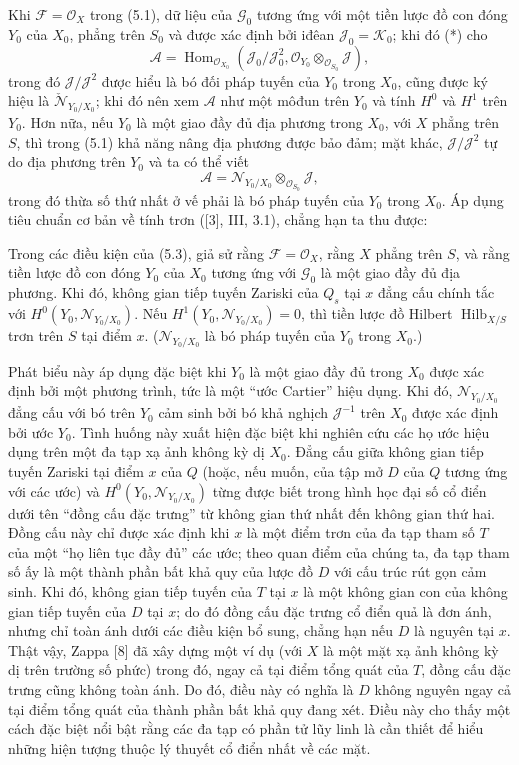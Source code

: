 Khi $\mathcal F=\mathcal O_X$ trong (5.1), dữ liệu của
$\mathcal G_0$ tương ứng với một tiền lược đồ con đóng $Y_0$ của
$X_0$, phẳng trên $S_0$ và được xác định bởi iđêan
$\mathcal J_0=\mathcal K_0$; khi đó (*) cho
\[
\mathcal A=\operatorname{Hom}_{\mathcal O_{X_0}}
(\mathcal J_0/\mathcal J_0^2,
\mathcal O_{Y_0}\otimes_{\mathcal O_{S_0}}\mathcal J),
\]
trong đó $\mathcal J/\mathcal J^2$ được hiểu là bó đối pháp tuyến của $Y_0$
trong $X_0$, cũng được ký hiệu là
$\check{\mathcal N}_{Y_0/X_0}$; khi đó nên xem $\mathcal A$ như một môđun
trên $Y_0$ và tính $H^0$ và $H^1$ trên $Y_0$. Hơn nữa, nếu $Y_0$ là một giao
đầy đủ địa phương trong $X_0$, với $X$ phẳng trên $S$, thì trong (5.1) khả
năng nâng địa phương được bảo đảm; mặt khác,
$\mathcal J/\mathcal J^2$ tự do địa phương trên $Y_0$ và ta có thể viết
\[
\mathcal A=\mathcal N_{Y_0/X_0}\otimes_{\mathcal O_{S_0}}\mathcal J,
\]
trong đó thừa số thứ nhất ở vế phải là bó pháp tuyến của $Y_0$ trong $X_0$.
Áp dụng tiêu chuẩn cơ bản về tính trơn ([3], III, 3.1), chẳng hạn ta thu được:

 Trong các điều kiện của (5.3), giả sử rằng
$\mathcal F=\mathcal O_X$, rằng $X$ phẳng trên $S$, và rằng tiền lược đồ con
đóng $Y_0$ của $X_0$ tương ứng với $\mathcal G_0$ là một giao đầy đủ địa
phương. Khi đó, không gian tiếp tuyến Zariski của $Q_s$ tại $x$ đẳng cấu chính
tắc với $H^0(Y_0,\mathcal N_{Y_0/X_0})$. Nếu
$H^1(Y_0,\mathcal N_{Y_0/X_0})=0$, thì tiền lược đồ Hilbert
$\operatorname{Hilb}_{X/S}$ trơn trên $S$ tại điểm $x$.
($\mathcal N_{Y_0/X_0}$ là bó pháp tuyến của $Y_0$ trong $X_0$.)

 Phát biểu này áp dụng đặc biệt khi $Y_0$ là một giao
đầy đủ trong $X_0$ được xác định bởi một phương trình, tức là một ``ước
Cartier'' hiệu dụng. Khi đó, $\mathcal N_{Y_0/X_0}$ đẳng cấu với bó trên $Y_0$
cảm sinh bởi bó khả nghịch $\mathcal J^{-1}$ trên $X_0$ được xác định bởi
ước $Y_0$. Tình huống này xuất hiện đặc biệt khi nghiên cứu các họ ước hiệu
dụng trên một đa tạp xạ ảnh không kỳ dị $X_0$. Đẳng cấu giữa không gian tiếp
tuyến Zariski tại điểm $x$ của $Q$ (hoặc, nếu muốn, của tập mở $D$ của $Q$
tương ứng với các ước) và $H^0(Y_0,\mathcal N_{Y_0/X_0})$ từng được biết trong
hình học đại số cổ điển dưới tên ``đồng cấu đặc trưng'' từ không gian thứ nhất
đến không gian thứ hai. Đồng cấu này chỉ được xác định khi $x$ là một điểm trơn
của đa tạp tham số $T$ của một ``họ liên tục đầy đủ'' các ước; theo quan điểm
của chúng ta, đa tạp tham số ấy là một thành phần bất khả quy của lược đồ $D$
với cấu trúc rút gọn cảm sinh. Khi đó, không gian tiếp tuyến của $T$ tại $x$ là
một không gian con của không gian tiếp tuyến của $D$ tại $x$; do đó đồng cấu
đặc trưng cổ điển quả là đơn ánh, nhưng chỉ toàn ánh dưới các điều kiện bổ
sung, chẳng hạn nếu $D$ là nguyên tại $x$. Thật vậy, Zappa [8] đã xây dựng
một ví dụ
(với $X$ là một mặt xạ ảnh không kỳ dị trên trường số phức) trong đó, ngay cả
tại điểm tổng quát của $T$, đồng cấu đặc trưng cũng không toàn ánh. Do đó, điều
này có nghĩa là $D$ không nguyên ngay cả tại điểm tổng quát của thành phần bất
khả quy đang xét. Điều này cho thấy một cách đặc biệt nổi bật rằng các đa tạp
có phần tử lũy linh là cần thiết để hiểu những hiện tượng thuộc lý thuyết cổ
điển nhất về các mặt.


